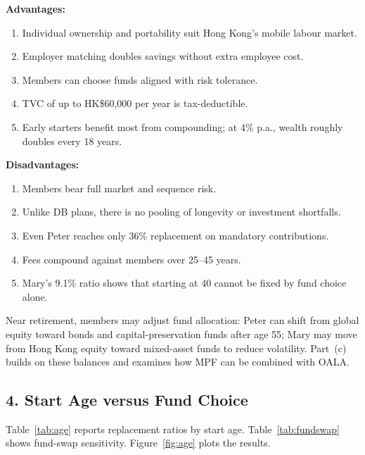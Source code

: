 \documentclass[12pt, letterpaper]{article}
\begin{document}
\textbf{Advantages:}
\begin{enumerate}
  \item Individual ownership and portability suit Hong Kong's mobile labour market.
  \item Employer matching doubles savings without extra employee cost.
  \item Members can choose funds aligned with risk tolerance.
  \item TVC of up to HK\$60,000 per year is tax-deductible.
  \item Early starters benefit most from compounding; at 4\% p.a., wealth roughly doubles every 18 years.
\end{enumerate}

\textbf{Disadvantages:}
\begin{enumerate}
  \item Members bear full market and sequence risk.
  \item Unlike DB plans, there is no pooling of longevity or investment shortfalls.
  \item Even Peter reaches only 36\% replacement on mandatory contributions.
  \item Fees compound against members over 25--45 years.
  \item Mary's 9.1\% ratio shows that starting at 40 cannot be fixed by fund choice alone.
\end{enumerate}

Near retirement, members may adjust fund allocation: Peter can shift from global equity toward bonds and capital-preservation funds after age 55; Mary may move from Hong Kong equity toward mixed-asset funds to reduce volatility. Part~(c) builds on these balances and examines how MPF can be combined with OALA.

\subsection*{4. Start Age versus Fund Choice}

Table~\ref{tab:age} reports replacement ratios by start age. Table~\ref{tab:fundswap} shows fund-swap sensitivity. Figure~\ref{fig:age} plots the results.
\end{document}
